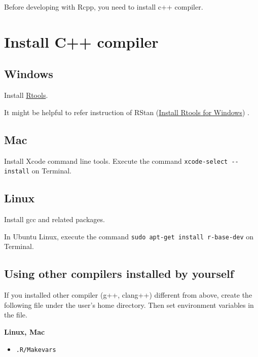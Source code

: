 \documentclass[]{book}
\providecommand{\tightlist}{%
  \setlength{\itemsep}{0pt}\setlength{\parskip}{0pt}}
\begin{document}
Before developing with Rcpp, you need to install c++ compiler.

\hypertarget{install-c-compiler}{%
\section{Install C++ compiler}\label{install-c-compiler}}

\hypertarget{windows}{%
\subsection{Windows}\label{windows}}

Install \href{https://cran.r-project.org/bin/windows/Rtools/index.html}{Rtools}.

It might be helpful to refer instruction of RStan (\href{https://github.com/stan-dev/rstan/wiki/Install-Rtools-for-Windows}{Install Rtools for Windows}) .

\hypertarget{mac}{%
\subsection{Mac}\label{mac}}

Install Xcode command line tools. Execute the command \texttt{xcode-select\ -\/-install} on Terminal.

\hypertarget{linux}{%
\subsection{Linux}\label{linux}}

Install gcc and related packages.

In Ubuntu Linux, execute the command \texttt{sudo\ apt-get\ install\ r-base-dev} on Terminal.

\hypertarget{using-other-compilers-installed-by-yourself}{%
\subsection{Using other compilers installed by yourself}\label{using-other-compilers-installed-by-yourself}}

If you installed other compiler (g++, clang++) different from above, create the following file under the user's home directory. Then set environment variables in the file.

\textbf{Linux, Mac}

\begin{itemize}
\tightlist
\item
  \texttt{.R/Makevars}
\end{itemize}
\end{document}

